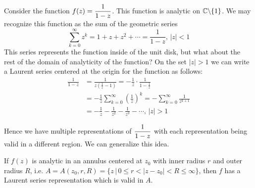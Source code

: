 \documentclass[handout]{ximera}
\begin{document}
Consider the function $\displaystyle f(z) = \frac{1}{1-z}$. This function is analytic on $\mathbb C\backslash\{1\}$. 
We may recognize this function as the sum of the geometric series
\[
\sum_{k=0}^\infty z^k = 1+z+z^2 + \cdots = \frac{1}{1-z}, \, |z|<1
\]
This series represents the function inside of the unit disk, but what about the rest of the domain of analyticity of the function? 
On the set $|z|>1$ we can write a Laurent series centered at the origin for the function as follows:
\begin{align*}
\frac{1}{1-z} &= \frac{1}{z\left(\frac{1}{z} - 1\right)} = -\frac{1}{z}\cdot\frac{1}{1-\frac{1}{z}} \\
&= -\frac{1}{z} \sum_{k=0}^\infty \left(\frac{1}{z}\right)^k = -\sum_{k=0}^\infty \frac{1}{z^{k+1}}\\
&= -\frac{1}{z} - \frac{1}{z^2}- \frac{1}{z^3} - \cdots, \, |z|>1
\end{align*}

Hence we have multiple representations of $\displaystyle \frac{1}{1-z}$ with each representation being valid in a different region.
We can generalize this idea.

\begin{theorem}
If $f(z)$ is analytic in an annulus centered at $z_0$ with inner radius $r$ and outer radius $R$, i.e. $A = A(z_0, r, R) = \{z\,\big|\, 0\leq r <|z-z_0| < R \leq \infty\}$, then 
$f$ has a Laurent series representation which is valid in $A$.
\end{theorem}
\end{document}
